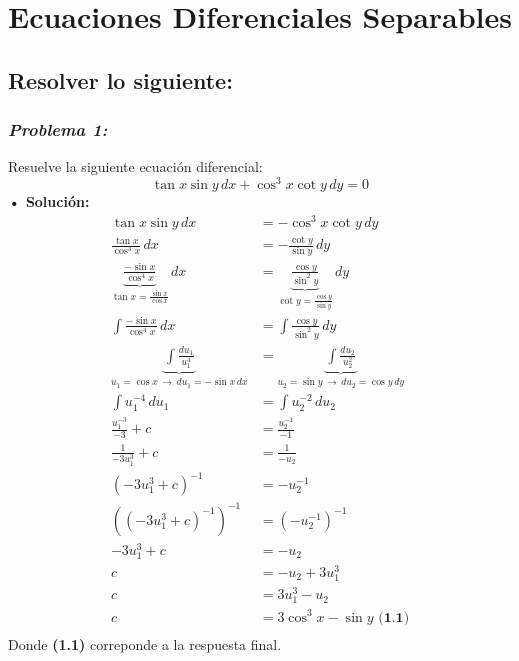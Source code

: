 \documentclass[letterpaper, 12pt]{article}
\begin{document}
\thispagestyle{fancy}
\section*{Ecuaciones Diferenciales Separables}
\subsection*{Resolver lo siguiente:}
\subsubsection*{\emph{Problema 1:}}
Resuelve la siguiente ecuación diferencial:
\[\tan x\sin y\, dx + \cos^3 x\cot y\, dy = 0\]
\textbf{• Solución:} 
\begin{equation*}
    \begin{aligned}
        \tan x\sin y\, dx &= -\cos^3 x\cot y\, dy \\[5pt]
        \frac{\tan x}{\cos^3 x}\, dx &= -\frac{\cot y}{\sin y}\, dy\\[5pt]
        \underbrace{\frac{-\sin x}{\cos^4 x}}_{\tan x=\frac{\sin x}{\cos x}}\, dx &= \underbrace{\frac{\cos y}{\sin^2 y}}_{\cot y = \frac{\cos y}{\sin y}}\, dy\\[5pt]
        \int \frac{-\sin x}{\cos^4 x}\, dx &= \int \frac{\cos y}{\sin^2 y}\, dy\\[10pt]
        \underbrace{\int \frac{du_1}{u^4_1}}_{u_1=\cos x\, \rightarrow \, du_1=-\sin x\, dx} &= \underbrace{\int \frac{du_2}{u^2_2}}_{u_2=\sin y \, \rightarrow \, du_2=\cos y \, dy}\\[5pt]
        \int u_1^{-4}\, du_1 &= \int u_2^{-2}\, du_2\\[5pt]
        \frac{u_1^{-3}}{-3}+c &= \frac{u_2^{-1}}{-1}\\[5pt]
        \frac{1}{-3u_1^{3}}+c &= \frac{1}{-u_2}\\[5pt]
        \left(-3u_1^3+c\right)^{-1} &= -u_2^{-1}\\[5pt]
        \left(\left(-3u_1^3+c\right)^{-1}\right)^{-1} &= \left(-u_2^{-1}\right)^{-1}\\[5pt]
        -3u_1^{3} + c &= -u_2\\[5pt]
        c &= -u_2 + 3u_1^{3}\\[5pt]
        c &= 3u_1^{3} - u_2\\[5pt]
        c &= 3\cos^3 x - \sin y\,\, \textbf{(1.1)}\\[5pt]
    \end{aligned}
\end{equation*}
Donde \textbf{(1.1)} correponde a la respuesta final.
\end{document}
